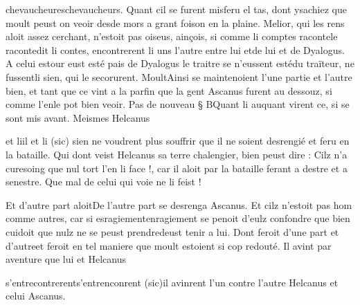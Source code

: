 \documentclass{article}
\begin{document}
\begin{pages}
                  chevaucheureschevaucheurs. Quant cil se furent 
                  misferu el tas, 
                  dont ysachiez que moult peust on veoir 
                  desde mors 
                  a grant foison en la plaine. Melior, qui les rens aloit 
                  assez cerchant, n’estoit pas oiseus, ainçois, si comme 
                     li comptes 
                           racontele racontedit li contes, encontrerent li uns l’autre 
                  entre lui etde lui et de
               Dyalogus. A celui estour eust esté pais 
                  de Dyalogus le traitre
                     se n’eussent estédu traïteur, ne fussentli sien, qui le secorurent. 
                  MoultAinsi se maintenoient l’une partie et l’autre 
                  bien, et tant que 
                  ce vint a la parfin 
                  que la gent Ascanus furent au dessouz, 
                  si comme 
                           l’enle pot bien veoir. \pend
            \pstart Pas de nouveau § BQuant li
               auquant virent ce, si se sont mis avant. Meismes Helcanus
               
                  et liil et li (sic) sien ne voudrent plus souffrir que il ne soient desrengié et feru en la
               bataille. Qui dont veist Helcanus sa terre
               chalengier, bien peust dire : Cilz n’a 
                     curesoing que nul tort l’en 
                     li face !, car il aloit par la bataille ferant a destre et a senestre.
                  Que mal de celui qui voie ne li feist !
               
                  Et d’autre part aloitDe l'autre part se desrenga
               Ascanus. Et cilz n’estoit pas hom comme autres,
               car si 
                  esragiementenragiement se penoit d’eulz confondre que bien cuidoit que nulz ne se 
                  peust prendredeust tenir a lui. 
                  Dont feroit d’une part et d'autreet feroit en tel maniere que moult estoient si cop redouté. Il avint par aventure que 
                  lui et Helcanus
                     
                        s'entrecontrerents’entrenconrent (sic)il avinrent l'un contre l'autre Helcanus et celui Ascanus. 
                  

\end{pages}
\end{document}
